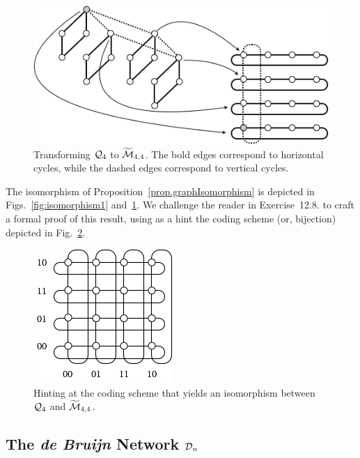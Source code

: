 \begin{figure}[hbt]
\begin{center}
       \includegraphics[scale=0.5]{FiguresGraph/Isomorphism2}
       \caption{Transforming $\mbox{$\cal Q$}_4$ to $\widetilde{\mbox{$\cal M$}}_{4,4}$.  The bold edges correspond to horizontal cycles, while the dashed edges correspond to vertical cycles.}
  \label{fig:isomorphism2}
\end{center}
\end{figure}

The isomorphism of Proposition~\ref{prop.graphIsomorphism} is depicted in Figs.~\ref{fig:isomorphism1} and~\ref{fig:isomorphism2}.  We challenge the reader in Exercise~12.8. to craft a formal proof of this result, using as a hint the coding scheme (or, bijection) depicted in Fig.~\ref{fig:toruslabel}.
\begin{figure}[hbt]
\begin{center}
       \includegraphics[scale=0.6]{FiguresGraph/toruslabel}
\caption{Hinting at the coding scheme that yields an isomorphism between $\mbox{$\cal Q$}_4$ and $\widetilde{\mbox{$\cal M$}}_{4,4}$.}
  \label{fig:toruslabel}
\end{center}
\end{figure}


\subsection{The {\it de Bruijn} Network $\mbox{$\cal D$}_n$}
\label{sec:deBruijn}



